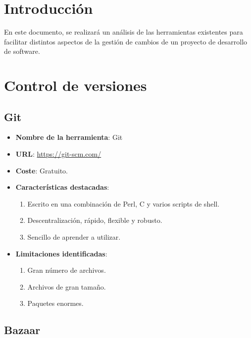 	\listoftables	
	
	\newpage	
 
\section{Introducción}

En este documento, se realizará un análisis de las herramientas existentes para facilitar distintos aspectos de la gestión de cambios de un proyecto de desarrollo de software. 

\section{Control de versiones}

\subsection{Git}

\begin{itemize}
	\item \textbf{Nombre de la herramienta}: Git
	\item \textbf{URL}: \url{https://git-scm.com/}
	\item \textbf{Coste}: Gratuito.
	\item \textbf{Características destacadas}:
		\begin{enumerate}
			\item Escrito en una combinación de Perl, C y varios scripts de shell.
			\item Descentralización, rápido, flexible y robusto.
			\item Sencillo de aprender a utilizar.
		\end{enumerate}
	\item \textbf{Limitaciones identificadas}:
		\begin{enumerate}
			\item Gran número de archivos.
			\item Archivos de gran tamaño.
			\item Paquetes enormes.
		\end{enumerate}
\end{itemize}

\subsection{Bazaar}

